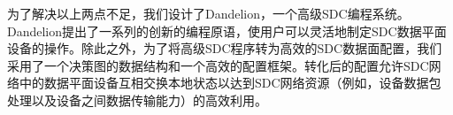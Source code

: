 
为了解决以上两点不足，我们设计了Dandelion，一个高级SDC编程系统。Dandelion提出了一系列的创新的编程原语，使用户可以灵活地制定SDC数据平面设备的操作。除此之外，为了将高级SDC程序转为高效的SDC数据面配置，我们采用了一个决策图的数据结构和一个高效的配置框架。转化后的配置允许SDC网络中的数据平面设备互相交换本地状态以达到SDC网络资源（例如，设备数据包处理以及设备之间数据传输能力）的高效利用。

%
 
